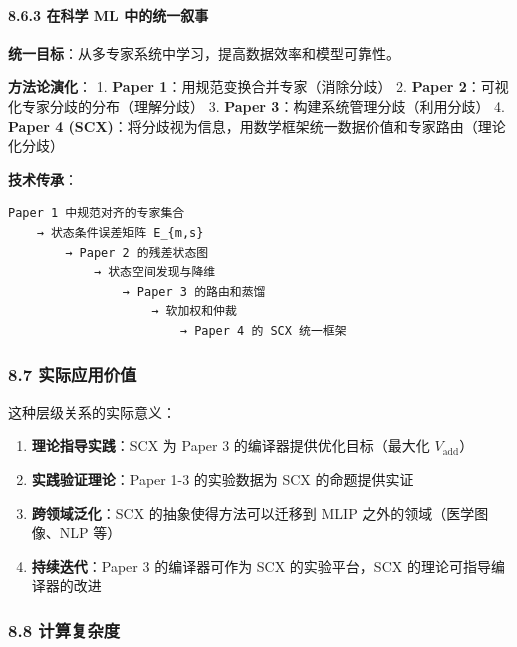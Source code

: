 \documentclass[
  12pt,
]{ctexart}
\providecommand{\tightlist}{%
  \setlength{\itemsep}{0pt}\setlength{\parskip}{0pt}}
\begin{document}
\paragraph{8.6.3 在科学 ML
中的统一叙事}\label{ux5728ux79d1ux5b66-ml-ux4e2dux7684ux7edfux4e00ux53d9ux4e8b}

\textbf{统一目标}：从多专家系统中学习，提高数据效率和模型可靠性。

\textbf{方法论演化}： 1. \textbf{Paper
1}：用规范变换合并专家（消除分歧） 2. \textbf{Paper
2}：可视化专家分歧的分布（理解分歧） 3. \textbf{Paper
3}：构建系统管理分歧（利用分歧） 4. \textbf{Paper 4
(SCX)}：将分歧视为信息，用数学框架统一数据价值和专家路由（理论化分歧）

\textbf{技术传承}：

\begin{verbatim}
Paper 1 中规范对齐的专家集合
    → 状态条件误差矩阵 E_{m,s}
        → Paper 2 的残差状态图
            → 状态空间发现与降维
                → Paper 3 的路由和蒸馏
                    → 软加权和仲裁
                        → Paper 4 的 SCX 统一框架
\end{verbatim}

\subsubsection{8.7
实际应用价值}\label{ux5b9eux9645ux5e94ux7528ux4ef7ux503c}

这种层级关系的实际意义：

\begin{enumerate}
\def\labelenumi{\arabic{enumi}.}
\tightlist
\item
  \textbf{理论指导实践}：SCX 为 Paper 3 的编译器提供优化目标（最大化
  \(V_{\text{add}}\)）
\item
  \textbf{实践验证理论}：Paper 1-3 的实验数据为 SCX 的命题提供实证
\item
  \textbf{跨领域泛化}：SCX 的抽象使得方法可以迁移到 MLIP
  之外的领域（医学图像、NLP 等）
\item
  \textbf{持续迭代}：Paper 3 的编译器可作为 SCX 的实验平台，SCX
  的理论可指导编译器的改进
\end{enumerate}

\subsubsection{8.8 计算复杂度}\label{ux8ba1ux7b97ux590dux6742ux5ea6-7}
\end{document}
